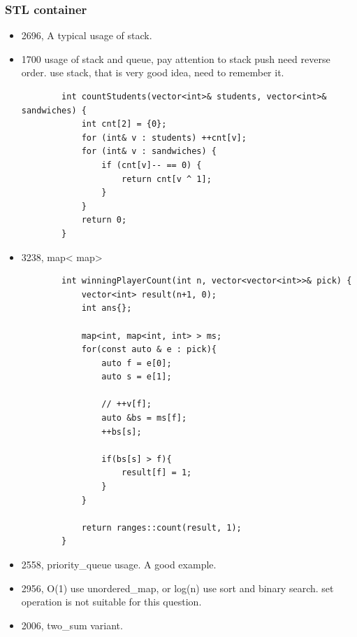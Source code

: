 \documentclass[a4paper,11pt,twoside]{book}
\begin{document}
\subsubsection{STL container}
\begin{itemize}
	
		\item 2696, A typical usage of stack.
	
	
	\item 1700 usage of stack and queue, pay attention to stack push need reverse order. use stack, that is very good idea, need to remember it. 
	\begin{lstlisting}
		int countStudents(vector<int>& students, vector<int>& sandwiches) {
			int cnt[2] = {0};
			for (int& v : students) ++cnt[v];
			for (int& v : sandwiches) {
				if (cnt[v]-- == 0) {
					return cnt[v ^ 1];
				}
			}
			return 0;
		}
	\end{lstlisting}
	
			\item 3238, map< map>
	\begin{lstlisting}
		int winningPlayerCount(int n, vector<vector<int>>& pick) {
			vector<int> result(n+1, 0);
			int ans{};
			
			map<int, map<int, int> > ms;
			for(const auto & e : pick){
				auto f = e[0];
				auto s = e[1];
				
				// ++v[f];
				auto &bs = ms[f];
				++bs[s];
				
				if(bs[s] > f){
					result[f] = 1;
				}
			}
			
			return ranges::count(result, 1);
		}
	\end{lstlisting} 
	
	
	\item 2558, priority\_queue usage. A good example.
	
	\item 2956, O(1) use unordered\_map, or log(n) use sort and binary search.  set operation is not suitable for this question. 
	
	\item 2006, two\_sum variant.
	
\end{itemize}
\end{document}
